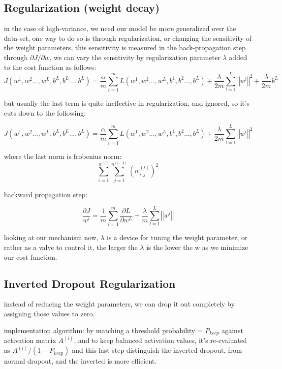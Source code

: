 \documentclass[4apaper,12pt]{book}
\begin{document}
\begin{description}
  \subsection {Regularization (weight decay)}
\item in the case of high-variance, we need our model be more generalized over the data-set, one way to do so is through regularization, or changing the sensitivity of the weight parameters, this sensitivity is measured in the back-propagation step through $\partial{J}/\partial{w}$, we can vary the sensitivity by regularization parameter $\lambda$ added to the cost function  as follows:
  $$ J(w^1,w^2...,w^L,b^L,b^L...,b^L) = \frac{\alpha}{m}\sum_{i=1}^{m}{L(w^1,w^2...,w^L,b^1,b^2...,b^L)} + \frac{\lambda}{2m} \sum_{l=1}^{L} {\left\Vert w^{i} \right\Vert^2}  + \frac{\lambda}{2m}b^L $$

\item but usually the last term is quite ineffective in regularization, and ignored, so it's cuts down to the following:

\item $$ J(w^1,w^2...,w^L,b^L,b^L...,b^L) = \frac{\alpha}{m}\sum_{i=1}^{m}{L(w^1,w^2...,w^L,b^1,b^2...,b^L)}  + \frac{\lambda}{2m}  \sum_{l=1}^{L} {\left\Vert w^{i} \right\Vert^2} $$

\item where the last norm is frobenius norm:
  $$ \sum_{i=1}^{n^{(l)}} \sum_{j=1}^{n^{(l-1)}} (w_{i,j}^{(l)})^2 $$

\item backward propagation step:

\item  $$ \frac{\partial{J}}{w^{i}} = \frac{1}{m}\sum_{i=1}^{m}{\frac{\partial{L}}{\partial{w^L}}}  + \frac{\lambda}{m}  \sum_{l=1}^{L} {\left\Vert w^{i} \right\Vert} $$

\item looking at our mechanism now, $\lambda$ is a device for tuning the weight parameter, or rather as a valve to control it, the larger the $\lambda$ is the lower the w as we minimize our cost function.

  \subsection {Inverted Dropout Regularization}
\item instead of reducing the weight parameters, we can drop it out completely by assigning those values to zero.
\item implementation algorithm: by matching a threshold probability = $P_{keep}$ against activation matrix $A^{(i)}$, and to keep balanced activation values, it's re-evaluated as $A^{(i)}/(1-P_{keep})$ and this last step distinguish the inverted dropout, from normal dropout, and the inverted is more efficient.


\end{description}
\end{document}
